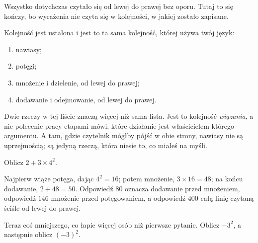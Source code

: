 \begin{fr}
Wszystko dotychczas czytało się od lewej do prawej bez oporu. Tutaj to się
kończy, bo wyrażenia nie czyta się w kolejności, w jakiej zostało zapisane.

Kolejność jest ustalona i jest to ta sama kolejność, której używa twój język:

\begin{enumerate}
\item nawiasy;
\item potęgi;
\item mnożenie i dzielenie, od lewej do prawej;
\item dodawanie i odejmowanie, od lewej do prawej.
\end{enumerate}

Dwie rzeczy w tej liście znaczą więcej niż sama lista. Jest to kolejność
\emph{wiązania}, a nie polecenie pracy etapami \dash{} mówi, które działanie
jest właścicielem którego argumentu. A tam, gdzie czytelnik mógłby pójść w obie
strony, nawiasy nie są uprzejmością; są jedyną rzeczą, która niesie to, co
miałeś na myśli.

Oblicz $2 + 3 \times 4^{2}$.
\nextframe
\end{fr}

\begin{fr}
Najpierw wiąże potęga, dając $4^{2} = 16$; potem mnożenie, $3 \times 16 = 48$;
na końcu dodawanie, $2 + 48 = 50$. Odpowiedź $80$ oznacza dodawanie przed
mnożeniem, odpowiedź $146$ \dash{} mnożenie przed potęgowaniem, a odpowiedź
$400$ \dash{} całą linię czytaną ściśle od lewej do prawej.

Teraz coś mniejszego, co łapie więcej osób niż pierwsze pytanie. Oblicz
$-3^{2}$, a następnie oblicz $(-3)^{2}$.
\nextframe
\end{fr}

